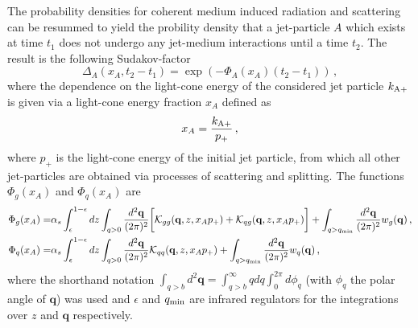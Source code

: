 \documentclass[preprint,12pt]{elsarticle}
\begin{document}
The probability densities for coherent medium induced radiation and scattering can be resummed to yield the probility density that a jet-particle $A$  
which exists at time $t_1$ does not undergo any jet-medium interactions until a time $t_2$. The result is the following Sudakov-factor
%
\begin{equation}
    \Delta_A(x_A,t_2-t_1)=\exp{\left(-\Phi_A(x_A)(t_2-t_1)\right)}\,,
    \label{eq:sud}
\end{equation}
%
where the dependence on the light-cone energy of the considered jet particle $k_{\rm A+}$ is given via a light-cone energy fraction $x_A$ defined as 
\begin{equation}
x_A=\frac{k_{\rm A+}}{p_+}\,,
\end{equation}
%
where $p_+$ is the light-cone energy of the initial jet particle, from which all other jet-particles are obtained via processes of scattering and splitting. The functions $\Phi_g(x_A)$ and $\Phi_q(x_A)$ are 
%
\begin{align}
    \Phi_g(x_A)=&\alpha_s\int_\epsilon^{1-\epsilon} dz\int_{q>0} \frac{d^2\mathbf{q}}{(2\pi)^2}\bigg[\mathcal{K}_{gg}(\mathbf{q},z,x_Ap_+)+\mathcal{K}_{qg}(\mathbf{q},z,x_Ap_+)\bigg]+\int_{q>q_{\rm min}} \frac{d^2\mathbf{q}}{(2\pi)^2}w_g(\mathbf{q})\,,
    \label{eq:phig}\\
    \Phi_q(x_A)=&\alpha_s\int_\epsilon^{1-\epsilon} dz\int_{q>0}\frac{d^2\mathbf{q}}{(2\pi)^2}\mathcal{K}_{qq}(\mathbf{q},z,x_Ap_+)+\int_{q>q_{\rm min}} \frac{d^2\mathbf{q}}{(2\pi)^2}w_q(\mathbf{q})\,,
    \label{eq:phiq}
\end{align}
%
where the shorthand notation $\int_{q>b}d^2\mathbf{q}=\int_{q>b}^\infty q dq \int_{0}^{2\pi}d\phi_q$ (with $\phi_q$ the polar angle of $\mathbf{q}$) was used and $\epsilon$ and $q_{\rm min}$ are infrared regulators for the integrations over $z$ and $\mathbf{q}$ respectively.
\end{document}
